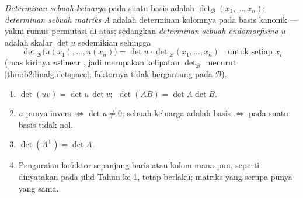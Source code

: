 \begin{definition}[Determinan]\label{def:b2:linalg:det}
\emph{Determinan sebuah keluarga} pada suatu basis
adalah $\det_{\mathcal{B}}(x_1, \dots, x_n)$; \emph{determinan sebuah
matriks} $A$ adalah determinan kolomnya pada basis kanonik
--- yakni rumus permutasi di atas; sedangkan \emph{determinan sebuah
endomorfisma} $u$ adalah skalar $\det u$ sedemikian sehingga
\[
\det{}_{\mathcal{B}}\bigl(u(x_1), \dots, u(x_n)\bigr)
= \det u \cdot \det{}_{\mathcal{B}}(x_1, \dots, x_n)
\quad \text{untuk setiap } x_i
\]
(ruas kirinya $n$-linear , jadi merupakan kelipatan
$\det_\mathcal{B}$ menurut \cref{thm:b2:linalg:detspace}; faktornya tidak
bergantung pada $\mathcal{B}$).
\end{definition}

\begin{theorem}\label{thm:b2:linalg:detrules}
\begin{enumerate}
  \item $\det(uv) = \det u\,\det v$; $\;\det(AB) = \det A \det B$.
  \item $u$ punya invers $\iff \det u \neq 0$; sebuah keluarga adalah
        basis $\iff$  pada suatu basis tidak nol.
  \item $\det(A^{\mathsf T}) = \det A$.
  \item Penguraian kofaktor sepanjang baris atau kolom mana pun, seperti
        dinyatakan pada jilid Tahun ke-1, tetap berlaku; matriks yang
        serupa punya  yang sama.
\end{enumerate}
\end{theorem}

